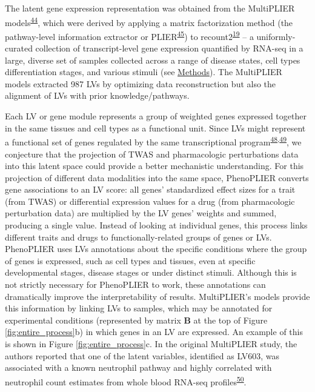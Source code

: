 \documentclass[
  a4paper,
]{article}
\begin{document}
The latent gene expression representation was obtained from the MultiPLIER models\textsuperscript{\protect\hyperlink{ref-14rnBunuZ}{44}}, which were derived by applying a matrix factorization method (the pathway-level information extractor or PLIER\textsuperscript{\protect\hyperlink{ref-Ki2ij7zE}{45}}) to recount2\textsuperscript{\protect\hyperlink{ref-6SPTvFXq}{19}} -- a uniformly-curated collection of transcript-level gene expression quantified by RNA-seq in a large, diverse set of samples collected across a range of disease states, cell types differentiation stages, and various stimuli (see \protect\hyperlink{sec:methods:multiplier}{Methods}).
The MultiPLIER models extracted 987 LVs by optimizing data reconstruction but also the alignment of LVs with prior knowledge/pathways.

Each LV or gene module represents a group of weighted genes expressed together in the same tissues and cell types as a functional unit.
Since LVs might represent a functional set of genes regulated by the same transcriptional program\textsuperscript{\protect\hyperlink{ref-1FVd2WW6G}{48},\protect\hyperlink{ref-DN7TyZzb}{49}}, we conjecture that the projection of TWAS and pharmacologic perturbations data into this latent space could provide a better mechanistic understanding.
For this projection of different data modalities into the same space, PhenoPLIER converts gene associations to an LV score: all genes' standardized effect sizes for a trait (from TWAS) or differential expression values for a drug (from pharmacologic perturbation data) are multiplied by the LV genes' weights and summed, producing a single value.
Instead of looking at individual genes, this process links different traits and drugs to functionally-related groups of genes or LVs.
PhenoPLIER uses LVs annotations about the specific conditions where the group of genes is expressed, such as cell types and tissues, even at specific developmental stages, disease stages or under distinct stimuli.
Although this is not strictly necessary for PhenoPLIER to work, these annotations can dramatically improve the interpretability of results.
MultiPLIER's models provide this information by linking LVs to samples, which may be annotated for experimental conditions (represented by matrix \(\mathbf{B}\) at the top of Figure \ref{fig:entire_process}b) in which genes in an LV are expressed.
An example of this is shown in Figure \ref{fig:entire_process}c.
In the original MultiPLIER study, the authors reported that one of the latent variables, identified as LV603, was associated with a known neutrophil pathway and highly correlated with neutrophil count estimates from whole blood RNA-seq profiles\textsuperscript{\protect\hyperlink{ref-18TSqd1tG}{50}}.
\end{document}
